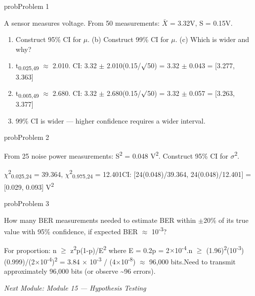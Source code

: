 \begin{PSbox}[unbreakable]{prob}{Problem 1}

A sensor measures voltage. From 50 measurements: \ensuremath{\bar{X}} = 3.32V, S = 0.15V.

\begin{enumerate}
\def\labelenumi{(\alph{enumi})}
\tightlist
\item
  Construct 95\% CI for \ensuremath{\mu}. (b) Construct 99\% CI for \ensuremath{\mu}. (c) Which is wider and why?
\end{enumerate}

\PSsolution{} 

\begin{enumerate}
\def\labelenumi{(\alph{enumi})}
\tightlist
\item
  t\textsubscript{0.025,49} \ensuremath{\approx} 2.010. CI: 3.32 \ensuremath{\pm} 2.010(0.15/\ensuremath{\surd}50) = 3.32 \ensuremath{\pm} 0.043 = [3.277, 3.363]
\item
  t\textsubscript{0.005,49} \ensuremath{\approx} 2.680. CI: 3.32 \ensuremath{\pm} 2.680(0.15/\ensuremath{\surd}50) = 3.32 \ensuremath{\pm} 0.057 = [3.263, 3.377]
\item
  99\% CI is wider — higher confidence requires a wider interval.
\end{enumerate}

\end{PSbox}

\begin{PSbox}[unbreakable]{prob}{Problem 2}

From 25 noise power measurements: S\textsuperscript{2} = 0.048 V\textsuperscript{2}. Construct 95\% CI for \ensuremath{\sigma}\textsuperscript{2}.

\PSsolution{} \ensuremath{\chi}\textsuperscript{2}\textsubscript{0.025,24} = 39.364, \ensuremath{\chi}\textsuperscript{2}\textsubscript{0.975,24} = 12.401\PSbr{}CI: [24(0.048)/39.364, 24(0.048)/12.401] = [0.029, 0.093] V\textsuperscript{2}

\end{PSbox}

\begin{PSbox}[unbreakable]{prob}{Problem 3}

How many BER measurements needed to estimate BER within \ensuremath{\pm}20\% of its true value with 95\% confidence, if expected BER \ensuremath{\approx} 10\textsuperscript{-3}?

\PSsolution{} For proportion: n \ensuremath{\ge} z\textsuperscript{2}p(1-p)/E\textsuperscript{2} where E = 0.2p = 2\ensuremath{\times}10\textsuperscript{-4}.\PSbr{}n \ensuremath{\ge} (1.96)\textsuperscript{2}(10\textsuperscript{-3})(0.999)/(2\ensuremath{\times}10\textsuperscript{-4})\textsuperscript{2} = 3.84 \ensuremath{\times} 10\textsuperscript{-3} / (4\ensuremath{\times}10\textsuperscript{-8}) \ensuremath{\approx} 96,000 bits.\PSbr{}Need to transmit approximately 96,000 bits (or observe \textasciitilde{}96 errors).

\emph{Next Module: {Module 15 — Hypothesis Testing}}

\end{PSbox}
